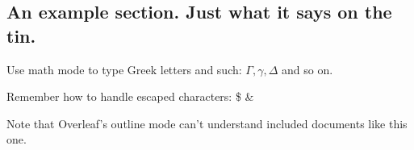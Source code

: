 \subsection{An example section. Just what it says on the tin.}
Use math mode to type Greek letters and such: $\Gamma, \gamma, \Delta$ and so on.

Remember how to handle escaped characters:
\$
\&

Note that Overleaf's outline mode can't understand included documents like this one.